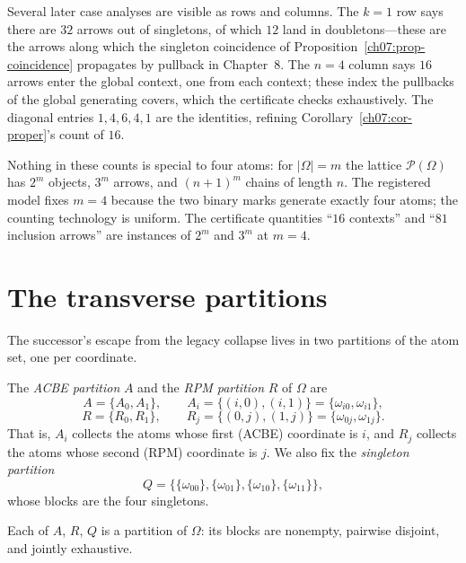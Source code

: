 \begin{remark}\label{ch07:rem-matrix}
Several later case analyses are visible as rows and columns. The $k=1$ row says there are $32$ arrows out of singletons, of which $12$ land in doubletons---these are the arrows along which the singleton coincidence of Proposition~\ref{ch07:prop-coincidence} propagates by pullback in Chapter~8. The $n=4$ column says $16$ arrows enter the global context, one from each context; these index the pullbacks of the global generating covers, which the certificate checks exhaustively. The diagonal entries $1,4,6,4,1$ are the identities, refining Corollary~\ref{ch07:cor-proper}'s count of $16$.
\end{remark}

\begin{remark}\label{ch07:rem-general}
Nothing in these counts is special to four atoms: for $|\Omega|=m$ the lattice $\mathcal{P}(\Omega)$ has $2^{m}$ objects, $3^{m}$ arrows, and $(n+1)^{m}$ chains of length $n$. The registered model fixes $m=4$ because the two binary marks generate exactly four atoms; the counting technology is uniform. The certificate quantities ``$16$ contexts'' and ``$81$ inclusion arrows'' are instances of $2^{m}$ and $3^{m}$ at $m=4$.
\end{remark}

\section{The transverse partitions}\label{ch07:sec-partitions}

The successor's escape from the legacy collapse lives in two partitions of the atom set, one per coordinate.

\begin{definition}\label{ch07:def-partitions}
The \emph{ACBE partition} $A$ and the \emph{RPM partition} $R$ of $\Omega$ are
\[
A=\{A_{0},A_{1}\},\qquad A_{i}=\{(i,0),(i,1)\}=\{\omega_{i0},\omega_{i1}\},
\]
\[
R=\{R_{0},R_{1}\},\qquad R_{j}=\{(0,j),(1,j)\}=\{\omega_{0j},\omega_{1j}\}.
\]
That is, $A_{i}$ collects the atoms whose first (ACBE) coordinate is $i$, and $R_{j}$ collects the atoms whose second (RPM) coordinate is $j$. We also fix the \emph{singleton partition}
\[
Q=\bigl\{\{\omega_{00}\},\{\omega_{01}\},\{\omega_{10}\},\{\omega_{11}\}\bigr\},
\]
whose blocks are the four singletons.
\end{definition}

\begin{proposition}\label{ch07:prop-partition-axioms}
Each of $A$, $R$, $Q$ is a partition of $\Omega$: its blocks are nonempty, pairwise disjoint, and jointly exhaustive.
\end{proposition}

